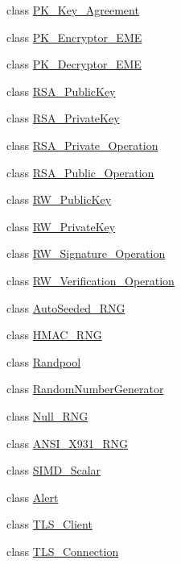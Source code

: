 \begin{DoxyCompactItemize}
\item 
class \hyperlink{classBotan_1_1PK__Key__Agreement}{P\-K\-\_\-\-Key\-\_\-\-Agreement}
\item 
class \hyperlink{classBotan_1_1PK__Encryptor__EME}{P\-K\-\_\-\-Encryptor\-\_\-\-E\-M\-E}
\item 
class \hyperlink{classBotan_1_1PK__Decryptor__EME}{P\-K\-\_\-\-Decryptor\-\_\-\-E\-M\-E}
\item 
class \hyperlink{classBotan_1_1RSA__PublicKey}{R\-S\-A\-\_\-\-Public\-Key}
\item 
class \hyperlink{classBotan_1_1RSA__PrivateKey}{R\-S\-A\-\_\-\-Private\-Key}
\item 
class \hyperlink{classBotan_1_1RSA__Private__Operation}{R\-S\-A\-\_\-\-Private\-\_\-\-Operation}
\item 
class \hyperlink{classBotan_1_1RSA__Public__Operation}{R\-S\-A\-\_\-\-Public\-\_\-\-Operation}
\item 
class \hyperlink{classBotan_1_1RW__PublicKey}{R\-W\-\_\-\-Public\-Key}
\item 
class \hyperlink{classBotan_1_1RW__PrivateKey}{R\-W\-\_\-\-Private\-Key}
\item 
class \hyperlink{classBotan_1_1RW__Signature__Operation}{R\-W\-\_\-\-Signature\-\_\-\-Operation}
\item 
class \hyperlink{classBotan_1_1RW__Verification__Operation}{R\-W\-\_\-\-Verification\-\_\-\-Operation}
\item 
class \hyperlink{classBotan_1_1AutoSeeded__RNG}{Auto\-Seeded\-\_\-\-R\-N\-G}
\item 
class \hyperlink{classBotan_1_1HMAC__RNG}{H\-M\-A\-C\-\_\-\-R\-N\-G}
\item 
class \hyperlink{classBotan_1_1Randpool}{Randpool}
\item 
class \hyperlink{classBotan_1_1RandomNumberGenerator}{Random\-Number\-Generator}
\item 
class \hyperlink{classBotan_1_1Null__RNG}{Null\-\_\-\-R\-N\-G}
\item 
class \hyperlink{classBotan_1_1ANSI__X931__RNG}{A\-N\-S\-I\-\_\-\-X931\-\_\-\-R\-N\-G}
\item 
class \hyperlink{classBotan_1_1SIMD__Scalar}{S\-I\-M\-D\-\_\-\-Scalar}
\item 
class \hyperlink{classBotan_1_1Alert}{Alert}
\item 
class \hyperlink{classBotan_1_1TLS__Client}{T\-L\-S\-\_\-\-Client}
\item 
class \hyperlink{classBotan_1_1TLS__Connection}{T\-L\-S\-\_\-\-Connection}

\end{DoxyCompactItemize}
